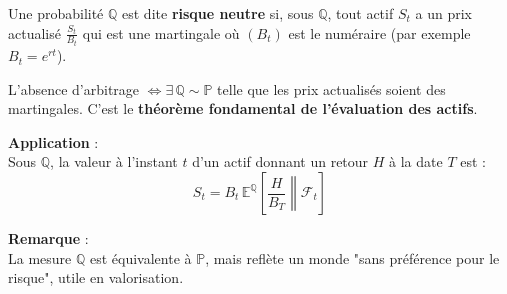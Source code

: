 \begin{f}
	
	Une probabilité $\mathbb{Q}$ est dite \textbf{risque neutre} si, sous $\mathbb{Q}$, 
	tout actif  $S_t$ a un prix actualisé $ \frac{S_t}{B_t}$ qui est une martingale
	où $(B_t)$ est le numéraire (par exemple $B_t = e^{rt}$).
	
	L'absence d'arbitrage $\iff \exists\, \mathbb{Q} \sim \mathbb{P}$ telle que les prix actualisés soient des martingales.
	C’est le \textbf{théorème fondamental de l’évaluation des actifs}.
	
	\textbf{Application} :\\
	Sous $\mathbb{Q}$, la valeur à l’instant $t$ d’un actif donnant un retour $H$ à la date $T$ est :
	\[
	S_t = B_t\, \mathbb{E}^\mathbb{Q} \left[ \left. \frac{H}{B_T} \right\|  \mathcal{F}_t \right]
	\]
	
	\textbf{Remarque} :\\
	La mesure $\mathbb{Q}$ est équivalente à $\mathbb{P}$, mais reflète un monde "sans préférence pour le risque", utile en valorisation.
	
\end{f}
\newcolumn

